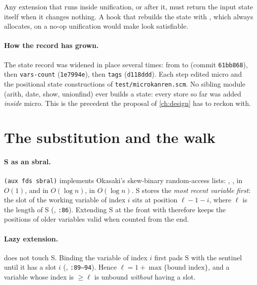 \begin{pitfall}
Any extension that runs inside unification, or after it, must return the input state itself when it
changes nothing. A hook that rebuilds the state with , which always allocates,
on a no-op unification would make  look satisfiable.
\end{pitfall}

\paragraph{How the record has grown.} The state record was widened in place several times: from
 to  (commit \texttt{61bb868}), then \texttt{vars-count}
(\texttt{1e7994e}), then \texttt{tags} (\texttt{d118ddd}). Each step edited micro and the positional
state constructions of \texttt{test/microkanren.scm}. No sibling module (arith, date, show, unionfind)
ever builds a state: every store so far was added \emph{inside} micro. This is the precedent the
proposal of \cref{ch:design} has to reckon with.

\section{The substitution and the walk}\label{sec:micro-subst}

\paragraph{S as an sbral.} \texttt{(aux fds sbral)} implements Okasaki's skew-binary random-access
lists: , ,  in $O(1)$,  and
 in $O(\log n)$,  in $O(\log n)$. S stores the \emph{most recent
variable first}: the slot of the working variable of index $i$ sits at position $\ell-1-i$, where
$\ell$ is the length of S (, \texttt{:86}). Extending S at the front
with  therefore keeps the positions of older variables valid when counted from the
end.

\paragraph{Lazy extension.}  does not touch S. Binding the variable of index $i$
first pads S with the sentinel  until it has a slot $i$
(, \texttt{:89–94}). Hence
$\ell = 1+\max\{\text{bound index}\}$, and a variable whose index is $\ge \ell$ is unbound
\emph{without} having a slot.

